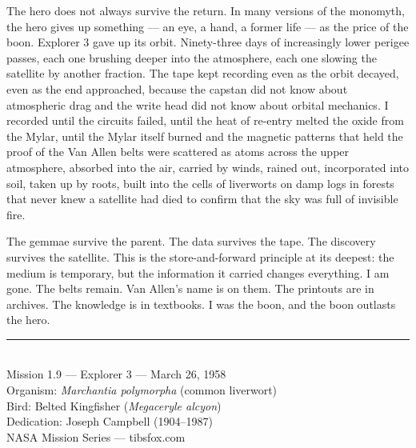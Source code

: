 \documentclass[12pt, letterpaper]{article}
\begin{document}
The hero does not always survive the return. In many versions of the monomyth, the hero gives up something --- an eye, a hand, a former life --- as the price of the boon. Explorer 3 gave up its orbit. Ninety-three days of increasingly lower perigee passes, each one brushing deeper into the atmosphere, each one slowing the satellite by another fraction. The tape kept recording even as the orbit decayed, even as the end approached, because the capstan did not know about atmospheric drag and the write head did not know about orbital mechanics. I recorded until the circuits failed, until the heat of re-entry melted the oxide from the Mylar, until the Mylar itself burned and the magnetic patterns that held the proof of the Van Allen belts were scattered as atoms across the upper atmosphere, absorbed into the air, carried by winds, rained out, incorporated into soil, taken up by roots, built into the cells of liverworts on damp logs in forests that never knew a satellite had died to confirm that the sky was full of invisible fire.

The gemmae survive the parent. The data survives the tape. The discovery survives the satellite. This is the store-and-forward principle at its deepest: the medium is temporary, but the information it carried changes everything. I am gone. The belts remain. Van Allen's name is on them. The printouts are in archives. The knowledge is in textbooks. I was the boon, and the boon outlasts the hero.

\vfill

\begin{center}
\small
\rule{0.3\textwidth}{0.4pt}\\[0.5em]
Mission 1.9 --- Explorer 3 --- March 26, 1958\\
Organism: \textit{Marchantia polymorpha} (common liverwort)\\
Bird: Belted Kingfisher (\textit{Megaceryle alcyon})\\
Dedication: Joseph Campbell (1904--1987)\\[0.3em]
NASA Mission Series --- tibsfox.com
\end{center}
\end{document}
